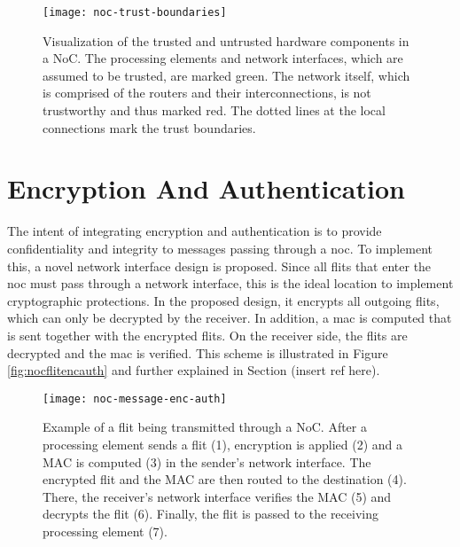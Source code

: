 \begin{figure}
    \centering
    \texttt{[image: noc-trust-boundaries]}
    \caption[Trust boundaries in a NoC]{Visualization of the trusted and untrusted hardware components in a NoC. The processing elements and network
    interfaces, which are assumed to be trusted, are marked green. The network itself, which is comprised of the routers and their interconnections,
    is not trustworthy and thus marked red. The dotted lines at the local connections mark the trust boundaries.}
    \label{fig:noctrustboundaries}
\end{figure}

\section{Encryption And Authentication}
The intent of integrating encryption and authentication is to provide confidentiality and integrity to messages passing through a \gls{noc}. To
implement this, a novel network interface design is proposed. Since all flits that enter the \gls{noc} must pass through a network interface, this is the
ideal location to implement cryptographic protections. In the proposed design, it encrypts all outgoing flits, which can only be decrypted by the
receiver. In addition, a \gls{mac} is computed that is sent together with the encrypted flits. On the receiver side, the flits are decrypted and the
\gls{mac} is verified. This scheme is illustrated in Figure \vref{fig:nocflitencauth} and further explained in Section (insert ref here).

\begin{figure}
    \centering
    \texttt{[image: noc-message-enc-auth]}
    \caption[Flit through NoC with encryption and authentication]{Example of a flit being transmitted through a NoC. After a processing element sends a flit (1),
    encryption is applied (2) and a MAC is computed (3) in the sender's network interface. The encrypted flit and the MAC are then routed to the
    destination (4). There, the receiver's network interface verifies the MAC (5) and decrypts the flit (6). Finally, the flit is passed to the
    receiving processing element (7).} %
    \label{fig:nocflitencauth}
\end{figure}

